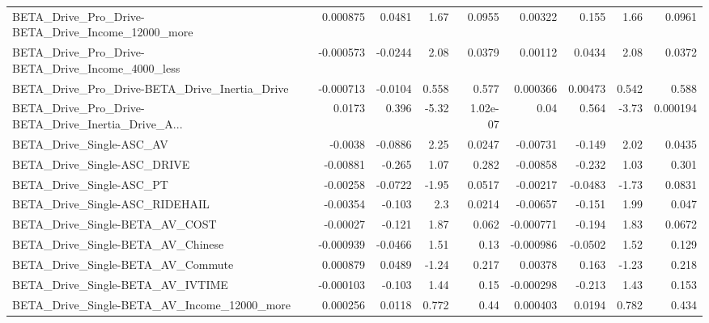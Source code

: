 \begin{tabular}{lrrrrrrrr}
BETA\_Drive\_Pro\_Drive-BETA\_Drive\_Income\_12000\_more  &    0.000875 &       0.0481 &     1.67 &   0.0955 &    0.00322 &       0.155 &         1.66 &        0.0961 \\
BETA\_Drive\_Pro\_Drive-BETA\_Drive\_Income\_4000\_less   &   -0.000573 &      -0.0244 &     2.08 &   0.0379 &    0.00112 &      0.0434 &         2.08 &        0.0372 \\
BETA\_Drive\_Pro\_Drive-BETA\_Drive\_Inertia\_Drive      &   -0.000713 &      -0.0104 &    0.558 &    0.577 &   0.000366 &     0.00473 &        0.542 &         0.588 \\
BETA\_Drive\_Pro\_Drive-BETA\_Drive\_Inertia\_Drive\_A... &      0.0173 &        0.396 &    -5.32 & 1.02e-07 &       0.04 &       0.564 &        -3.73 &      0.000194 \\
BETA\_Drive\_Single-ASC\_AV                           &     -0.0038 &      -0.0886 &     2.25 &   0.0247 &   -0.00731 &      -0.149 &         2.02 &        0.0435 \\
BETA\_Drive\_Single-ASC\_DRIVE                        &    -0.00881 &       -0.265 &     1.07 &    0.282 &   -0.00858 &      -0.232 &         1.03 &         0.301 \\
BETA\_Drive\_Single-ASC\_PT                           &    -0.00258 &      -0.0722 &    -1.95 &   0.0517 &   -0.00217 &     -0.0483 &        -1.73 &        0.0831 \\
BETA\_Drive\_Single-ASC\_RIDEHAIL                     &    -0.00354 &       -0.103 &      2.3 &   0.0214 &   -0.00657 &      -0.151 &         1.99 &         0.047 \\
BETA\_Drive\_Single-BETA\_AV\_COST                     &    -0.00027 &       -0.121 &     1.87 &    0.062 &  -0.000771 &      -0.194 &         1.83 &        0.0672 \\
BETA\_Drive\_Single-BETA\_AV\_Chinese                  &   -0.000939 &      -0.0466 &     1.51 &     0.13 &  -0.000986 &     -0.0502 &         1.52 &         0.129 \\
BETA\_Drive\_Single-BETA\_AV\_Commute                  &    0.000879 &       0.0489 &    -1.24 &    0.217 &    0.00378 &       0.163 &        -1.23 &         0.218 \\
BETA\_Drive\_Single-BETA\_AV\_IVTIME                   &   -0.000103 &       -0.103 &     1.44 &     0.15 &  -0.000298 &      -0.213 &         1.43 &         0.153 \\
BETA\_Drive\_Single-BETA\_AV\_Income\_12000\_more        &    0.000256 &       0.0118 &    0.772 &     0.44 &   0.000403 &      0.0194 &        0.782 &         0.434 \\

\end{tabular}
